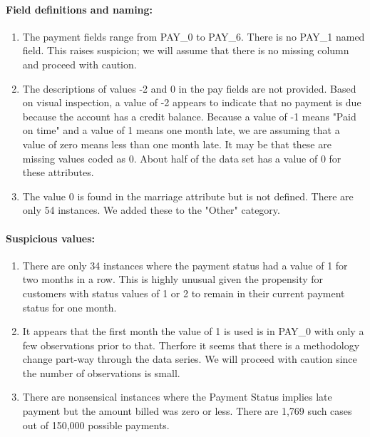 \documentclass[11pt]{article}
\providecommand{\tightlist}{%
      \setlength{\itemsep}{0pt}\setlength{\parskip}{0pt}}
\begin{document}
\paragraph{Field definitions and
naming:}\label{field-definitions-and-naming}

\begin{enumerate}
\def\labelenumi{\arabic{enumi}.}
\tightlist
\item
  The payment fields range from PAY\_0 to PAY\_6. There is no PAY\_1
  named field. This raises suspicion; we will assume that there is no
  missing column and proceed with caution.
\item
  The descriptions of values -2 and 0 in the pay fields are not
  provided. Based on visual inspection, a value of -2 appears to
  indicate that no payment is due because the account has a credit
  balance. Because a value of -1 means "Paid on time" and a value of 1
  means one month late, we are assuming that a value of zero means less
  than one month late. It may be that these are missing values coded as
  0. About half of the data set has a value of 0 for these attributes.
\item
  The value 0 is found in the marriage attribute but is not defined.
  There are only 54 instances. We added these to the "Other" category.
\end{enumerate}

\paragraph{Suspicious values:}\label{suspicious-values}

\begin{enumerate}
\def\labelenumi{\arabic{enumi}.}
\tightlist
\item
  There are only 34 instances where the payment status had a value of 1
  for two months in a row. This is highly unusual given the propensity
  for customers with status values of 1 or 2 to remain in their current
  payment status for one month.
\item
  It appears that the first month the value of 1 is used is in PAY\_0
  with only a few observations prior to that. Therfore it seems that
  there is a methodology change part-way through the data series. We
  will proceed with caution since the number of observations is small.
\item
  There are nonsensical instances where the Payment Status implies late
  payment but the amount billed was zero or less. There are 1,769 such
  cases out of 150,000 possible payments.
\end{enumerate}
\end{document}
